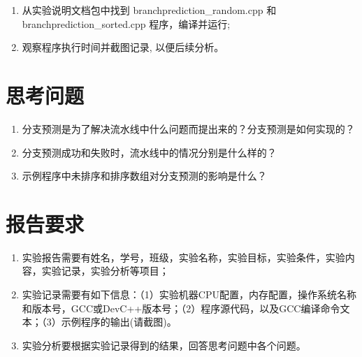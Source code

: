 \begin{enumerate}
	\item 从实验说明文档包中找到 branchprediction\_random.cpp 和 
		branchprediction\_sorted.cpp 程序，编译并运行;
	\item 观察程序执行时间并截图记录, 以便后续分析。
\end{enumerate}

\section{思考问题}

\begin{enumerate}
	\item 分支预测是为了解决流水线中什么问题而提出来的？分支预测是如何实现的？
	\item 分支预测成功和失败时，流水线中的情况分别是什么样的？
	\item 示例程序中未排序和排序数组对分支预测的影响是什么？
\end{enumerate}

\section{报告要求}

\begin{enumerate}
	\item 实验报告需要有姓名，学号，班级，实验名称，实验目标，实验条件，实验内容，实验记录，实验分析等项目；
	\item 实验记录需要有如下信息：（1）实验机器CPU配置，内存配置，操作系统名称和版本号，GCC或DevC++版本号；（2）程序源代码，以及GCC编译命令文本；（3）示例程序的输出(请截图)。
	\item 实验分析要根据实验记录得到的结果，回答思考问题中各个问题。
\end{enumerate}

